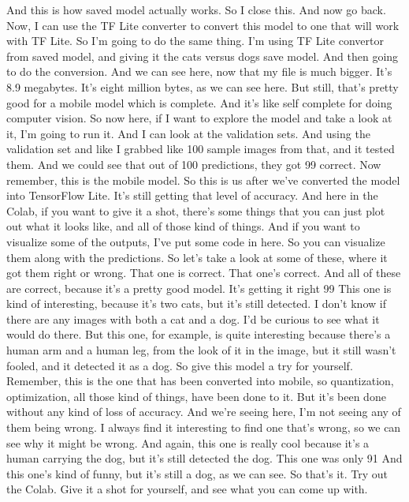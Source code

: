 And this is how saved model actually works.
So I close this.
And now go back.
Now, I can use the TF Lite converter to convert this model
to one that will work with TF Lite.
So I'm going to do the same thing.
I'm using TF Lite convertor from saved model,
and giving it the cats versus dogs save model.
And then going to do the conversion.
And we can see here, now that my file is much bigger.
It's 8.9 megabytes.
It's eight million bytes, as we can see here.
But still, that's pretty good for a mobile model which is complete.
And it's like self complete for doing computer vision.
So now here, if I want to explore the model and take a look at it,
I'm going to run it.
And I can look at the validation sets.
And using the validation set and like I grabbed like 100 sample images
from that, and it tested them.
And we could see that out of 100 predictions, they got 99 correct.
Now remember, this is the mobile model.
So this is us after we've converted the model into TensorFlow Lite.
It's still getting that level of accuracy.
And here in the Colab, if you want to give it a shot,
there's some things that you can just plot out what it looks like,
and all of those kind of things.
And if you want to visualize some of the outputs, I've put some code in here.
So you can visualize them along with the predictions.
So let's take a look at some of these, where it got them right or wrong.
That one is correct.
That one's correct.
And all of these are correct, because it's a pretty good model.
It's getting it right 99%
This one is kind of interesting, because it's two cats, but it's still detected.
I don't know if there are any images with both a cat and a dog.
I'd be curious to see what it would do there.
But this one, for example, is quite interesting
because there's a human arm and a human leg, from the look of it in the image,
but it still wasn't fooled, and it detected it as a dog.
So give this model a try for yourself.
Remember, this is the one that has been converted into mobile,
so quantization, optimization, all those kind of things, have been done to it.
But it's been done without any kind of loss of accuracy.
And we're seeing here, I'm not seeing any of them being wrong.
I always find it interesting to find one that's wrong,
so we can see why it might be wrong.
And again, this one is really cool because it's a human carrying the dog,
but it's still detected the dog.
This one was only 91%
And this one's kind of funny, but it's still a dog, as we can see.
So that's it.
Try out the Colab.
Give it a shot for yourself, and see what you can come up with.

